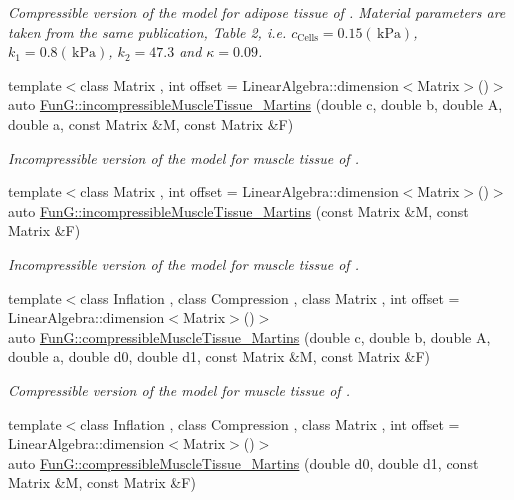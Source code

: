\begin{DoxyCompactItemize}
\begin{DoxyCompactList}\small\item\em Compressible version of the model for adipose tissue of \cite{Sommer2013}. Material parameters are taken from the same publication, Table 2, i.\-e. $c_\mathrm{Cells}=0.15 (\,\mathrm{kPa})$, $k_1=0.8 (\,\mathrm{kPa})$, $k_2=47.3$ and $\kappa=0.09$. \end{DoxyCompactList}\item 
{\footnotesize template$<$class Matrix , int offset = Linear\-Algebra\-::dimension$<$\-Matrix$>$()$>$ }\\auto \hyperlink{group__Biomechanics_gafcc36a1958899ca9246c4c1b3c9bfd85}{Fun\-G\-::incompressible\-Muscle\-Tissue\-\_\-\-Martins} (double c, double b, double A, double a, const Matrix \&M, const Matrix \&F)
\begin{DoxyCompactList}\small\item\em Incompressible version of the model for muscle tissue of \cite{Martins1998}. \end{DoxyCompactList}\item 
{\footnotesize template$<$class Matrix , int offset = Linear\-Algebra\-::dimension$<$\-Matrix$>$()$>$ }\\auto \hyperlink{group__Biomechanics_ga9e414585a90b1988e9fa88d17d875055}{Fun\-G\-::incompressible\-Muscle\-Tissue\-\_\-\-Martins} (const Matrix \&M, const Matrix \&F)
\begin{DoxyCompactList}\small\item\em Incompressible version of the model for muscle tissue of \cite{Martins1998}. \end{DoxyCompactList}\item 
{\footnotesize template$<$class Inflation , class Compression , class Matrix , int offset = Linear\-Algebra\-::dimension$<$\-Matrix$>$()$>$ }\\auto \hyperlink{group__Biomechanics_gad831914c493a3da04ed40c3c0ce87a62}{Fun\-G\-::compressible\-Muscle\-Tissue\-\_\-\-Martins} (double c, double b, double A, double a, double d0, double d1, const Matrix \&M, const Matrix \&F)
\begin{DoxyCompactList}\small\item\em Compressible version of the model for muscle tissue of \cite{Martins1998}. \end{DoxyCompactList}\item 
{\footnotesize template$<$class Inflation , class Compression , class Matrix , int offset = Linear\-Algebra\-::dimension$<$\-Matrix$>$()$>$ }\\auto \hyperlink{group__Biomechanics_ga46a70ccb2285e12addad87b6a8aaaae8}{Fun\-G\-::compressible\-Muscle\-Tissue\-\_\-\-Martins} (double d0, double d1, const Matrix \&M, const Matrix \&F)

\end{DoxyCompactItemize}

